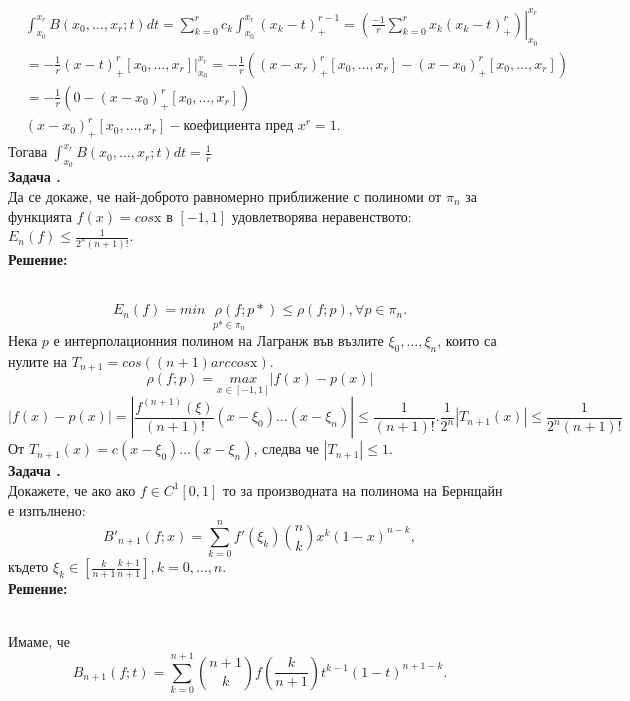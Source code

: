 \documentclass[12pt]{article}
\def\r#1{\mathrm{#1}}
\newcounter{problem}
\newcounter{solution}
\newcommand\problem{%
  \stepcounter{problem}%
  \textbf{Задача \theproblem.}~%
  \\
}
\newcommand\solution{%
  \textbf{Решение:}\\~%
}
\begin{document}
        \begin{align*}
        &\int_{x_0}^{x_r}B(x_0,\ldots,x_r;t)dt = 
        \sum_{k=0}^{r}c_k\int_{x_0}^{x_r}(x_k-t)^{r-1}_+
        =\left.\left(\frac{-1}{r}\sum_{k=0}^{r}x_k(x_k-t)^r_+\right)\right\rvert_{x_0}^{x_r} \\
        &= -\frac{1}{r}(x-t)^r_+[x_0,\ldots,x_r]\rvert_{x_0}^{x_r} 
        = -\frac{1}{r}((x-x_r)^r_+[x_0,\ldots,x_r] - (x-x_0)^r_+[x_0,\ldots,x_r]) \\
        &= -\frac{1}{r}(0 - (x-x_0)^r_+[x_0,\ldots,x_r]) \\
        &(x-x_0)^r_+[x_0,\ldots,x_r] - \text{коефициента пред } x^r = 1.
        \end{align*}
        Тогава $\boxed{\int_{x_0}^{x_r}B(x_0,\ldots,x_r;t)dt = \frac{1}{r}}$\\
    \problem
        Да се докаже, че най-доброто равномерно приближение с полиноми от $\pi_n$ за функцията $f(x) = cos\r x$ в $[-1,1]$ удовлетворява неравенството: $E_n(f) \leq \frac{1}{2^n(n+1)!}$.\\
    \solution
        \begin{equation*}
        E_n(f) = \underset{p*\in\pi_n}{min\text{ }\rho(f;p*)}\leq \rho(f;p),\forall p\in\pi_n.
        \end{equation*}
        Нека $p$ е интерполационния полином на Лагранж във възлите $\xi_0,\ldots,\xi_n$, които са нулите на $T_{n+1} = cos\left((n+1) arccos \r x\right)$.
        \begin{equation*}
        \rho(f;p)=\underset{x\in [-1,1]}{max}|f(x)-p(x)|
        \end{equation*}
        \begin{equation*}
        |f(x)-p(x)| = \left |\frac{f^{(n+1)}(\xi)}{(n+1)!}(x-\xi_0)\ldots(x-\xi_n)\right| \leq \frac{1}{(n+1)!}.\frac{1}{2^n}|T_{n+1}(x)|\leq\frac{1}{2^n (n+1)!}
        \end{equation*}
        От $T_{n+1}(x)=c(x-\xi_0)\ldots(x-\xi_n)$, следва че $|T_{n+1}|\leq 1$.\\
    \problem
        Докажете, че ако ако $f\in C^1[0,1]$ то за производната на полинома на Бернщайн е изпълнено:
        \begin{equation*}
        B'_{n+1}(f;x)=\sum_{k=0}^{n}f'(\xi_k){n\choose k}x^k(1-x)^{n-k},
        \end{equation*}
        където $\xi_k\in\left[\frac{k}{n+1}\frac{k+1}{n+1}\right], k=0,\ldots,n$.\\
    \solution
        Имаме, че 
        \begin{equation*}
        B_{n+1}(f;t)=\sum_{k=0}^{n+1}{n+1 \choose k} f\left(\frac{k}{n+1}\right)  t^{k-1}(1-t)^{n+1-k}.
        \end{equation*}
\end{document}
